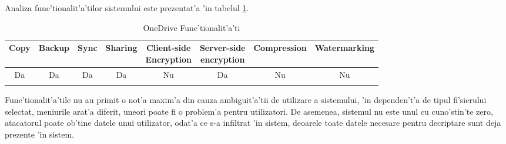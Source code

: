\documentclass[12pt,a4paper,twoside]{report}
\newcommand{\greencheck}{\color{green}  \ding{51}}
\newcommand{\redxmark}{\color{red} \ding{55}}
\begin{document}
Analiza func'tionalit'a'tilor sistemului este prezentat'a 'in tabelul \ref{table:onedrivefeaturetable}.
\begin{table}[H]
\small

\centering
\caption{OneDrive Func'tionalit'a'ti}
\begin{tabular}{|c|c|c|c|c|c|c|c|}          
\hline               
Copy & Backup & Sync & Sharing & \makecell{Client-side\\ Encryption} & \makecell{Server-side \\ encryption} & Compression & Watermarking \\ [0.5ex]   
\hline 
Da & Da & Da & Da & Nu & Da & Nu & Nu    \\                      
\greencheck & \greencheck\greencheck & \greencheck & \greencheck & \redxmark\redxmark & \redxmark\redxmark &  \redxmark\redxmark &  \redxmark\redxmark  \\               
\hline                              
\end{tabular}
\label{table:onedrivefeaturetable}             
\end{table}
Func'tionalit'a'tile nu au primit o not'a maxim'a din cauza ambiguit'a'tii de utilizare a sistemului, 'in dependen't'a de tipul fi'sierului selectat, meniurile arat'a diferit, uneori poate fi o problem'a pentru utilizatori. De asemenea, sistemul nu este unul cu cuno'stin'te zero, atacatorul poate ob'tine datele unui utilizator, odat'a ce s-a infiltrat 'in sistem, deoarele toate datele necesare pentru decriptare sunt deja prezente 'in sistem.
\end{document}
